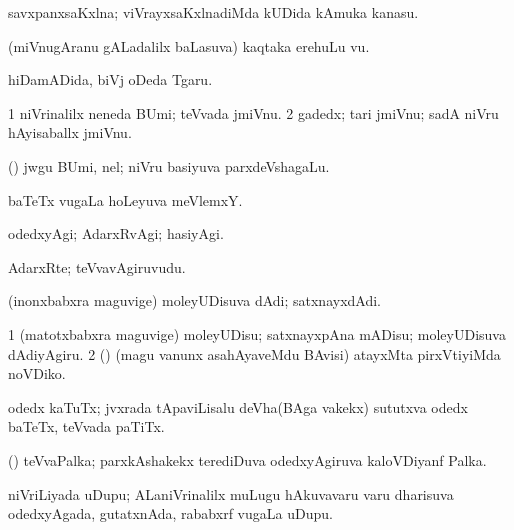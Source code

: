 {{{{{{\bentry
{} 
\gl{\nA}
\expl{}
\bmng
savxpanxsaKxlna; viVrayxsaKxlnadiMda kUDida kAmuka kanasu. 
\emng
\eentry

\bentry
{} 
\gl{\nA}
\expl{}
\bmng
(miVnugAranu gALadalilx baLasuva) kaqtaka erehuLu \mo vu. 
\emng
\eentry

\bentry
{} 
\gl{\nA}
\expl{}
\bmng
hiDamADida, biVj oDeda Tgaru. 
\emng
\eentry

\bentry
{} 
\gl{\nA}
\expl{}
\bmng
\bnum
\num{1} niVrinalilx neneda BUmi; teVvada jmiVnu. 
\num{2} gadedx; tari jmiVnu; sadA niVru hAyisaballx jmiVnu. 
\enum
\emng
\eentry

\bentry
{} 
\gl{\nA}
\expl{}
\bmng
(\bava) jwgu BUmi, nel; niVru basiyuva parxdeVshagaLu. 
\emng
\eentry

\bentry
{} 
\gl{\nA}
\expl{}
\bmng
baTeTx \mo vugaLa hoLeyuva meVlemxY. 
\emng
\eentry

\bentry
{} 
\gl{\kirxvi}
\expl{}
\bmng
odedxyAgi; AdarxRvAgi; hasiyAgi. 
\emng
\eentry

\bentry
{} 
\gl{\nA}
\expl{}
\bmng
AdarxRte; teVvavAgiruvudu. 
\emng
\eentry

\bentry
{} 
\gl{\nA}
\expl{}
\bmng
(inonxbabxra maguvige) moleyUDisuva dAdi; satxnayxdAdi. 
\emng
\eentry

\bentry
{} 
\gl{\sakirx}
\expl{}
\bmng
\bnum
\num{1} (matotxbabxra maguvige) moleyUDisu; satxnayxpAna mADisu; moleyUDisuva dAdiyAgiru. 
\num{2} (\AmA) (magu \mo vanunx asahAyaveMdu BAvisi) atayxMta pirxVtiyiMda noVDiko. 
\enum
\emng
\eentry

\bentry
{} 
\gl{\nA}
\expl{}
\bmng
odedx kaTuTx; jvxrada tApaviLisalu deVha(BAga \mo vakekx) sututxva odedx baTeTx, teVvada paTiTx. 
\emng
\eentry

\bentry
{} 
\gl{\nA}
\expl{}
\bmng
(\CA) teVvaPalka; parxkAshakekx terediDuva odedxyAgiruva kaloVDiyanf Palka. 
\emng
\eentry

\bentry
{} 
\gl{\nA}
\expl{}
\bmng
niVriLiyada uDupu; ALaniVrinalilx muLugu hAkuvavaru \mo varu dharisuva odedxyAgada, gutatxnAda, rababxrf \mo vugaLa uDupu. 
\emng
\eentry

}}}}}}
